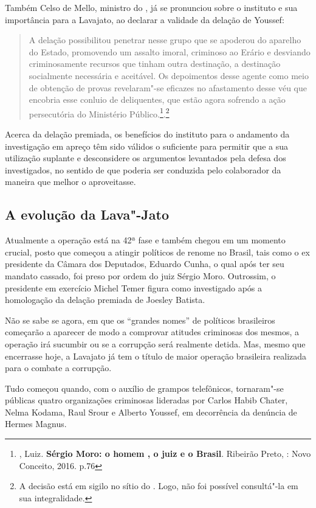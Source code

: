 Também Celso de Mello, ministro do , já se pronunciou sobre o
instituto e sua importância para a Lavajato, ao declarar a validade da
delação de Youssef:

\begin{quote}
A delação possibilitou penetrar nesse grupo que se apoderou do aparelho
do Estado, promovendo um assalto imoral, criminoso ao Erário e desviando
criminosamente recursos que tinham outra destinação, a destinação
socialmente necessária e aceitável. Os depoimentos desse agente como
meio de obtenção de provas revelaram"-se eficazes no afastamento desse
véu que encobria esse conluio de deliquentes, que estão agora sofrendo a
ação persecutória do Ministério Público.\footnote{, Luiz\emph{.}
  \textbf{Sérgio Moro: o homem , o juiz e o Brasil}. Ribeirão Preto, :
  Novo Conceito, 2016. p.76}.\footnote{A decisão está em sigilo no sítio
  do . Logo, não foi possível consultá"-la em sua integralidade.}
\end{quote}

Acerca da delação premiada, os benefícios do instituto para o andamento
da investigação em apreço têm sido válidos o suficiente para permitir
que a sua utilização suplante e desconsidere os argumentos levantados
pela defesa dos investigados, no sentido de que poderia ser conduzida
pelo colaborador da maneira que melhor o aproveitasse.

\subsection{A evolução da Lava"-Jato}

Atualmente a operação está na 42ª fase e também chegou em um momento
crucial, posto que começou a atingir políticos de renome no Brasil, tais
como o ex presidente da Câmara dos Deputados, Eduardo Cunha, o qual após
ter seu mandato cassado, foi preso por ordem do juiz Sérgio Moro.
Outrossim, o presidente em exercício Michel Temer figura como
investigado após a homologação da delação premiada de Joesley Batista.

Não se sabe se agora, em que os ``grandes nomes'' de políticos
brasileiros começarão a aparecer de modo a comprovar atitudes criminosas
dos mesmos, a operação irá sucumbir ou se a corrupção será realmente
detida. Mas, mesmo que encerrasse hoje, a Lavajato já tem o título de
maior operação brasileira realizada para o combate a corrupção.

Tudo começou quando, com o auxílio de grampos telefônicos, tornaram"-se
públicas quatro organizações criminosas lideradas por Carlos Habib
Chater, Nelma Kodama, Raul Srour e Alberto Youssef, em decorrência da
denúncia de Hermes Magnus.

